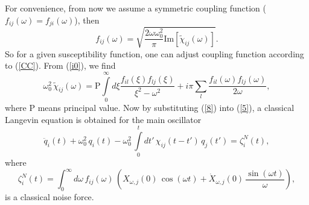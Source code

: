 \documentclass[preprint,showpacs,showkeys,groupedaddress,superscriptaddress]{revtex4}
\begin{document}
For convenience, from now we assume a symmetric coupling function ($f_{ij} (\omega)=f_{ji} (\omega)$), then
\begin{equation}\label{CC}
f_{ij} (\omega ) = \sqrt {\frac{2\omega\omega_0^2}{\pi}\mbox{Im}[\tilde{\chi} _{ij} (\omega )]}.
\end{equation}
So for a given susceptibility function, one can adjust coupling function according to (\ref{CC}). From (\ref{i0}), we find
\begin{equation}
 \omega_0^2\,\tilde{\chi} _{ij} (\omega ) = \mbox{P} \int\limits_0^\infty  {d\xi } \frac{{f_{il} (\xi )f_{lj} (\xi )}}{{\xi ^2  - \omega ^2 }} + i\pi \sum\limits_l {\frac{{f_{il} (\omega )f_{lj} (\omega )}}{{2\omega }}},
\end{equation}
where $\mbox{P}$ means principal value. Now by substituting (\ref{8}) into (\ref{5}), a classical Langevin equation is obtained for the main oscillator
\begin{equation}\label{LEq}
\ddot{q}_i (t) + \omega _0^2 \,q_i (t) -\omega_0^2\,\int\limits_0^t dt'\, \chi _{ij} (t - t')\,q_j (t') = \zeta _i^N (t),
\end{equation}
where
\begin{equation}\label{CNF}
  \zeta _i^N (t) = \int_0^\infty d\omega\, f_{ij} (\omega )\,\left(X_{\omega,j} (0)\,\cos(\omega t)+\dot{X}_{\omega,j} (0)\,\frac{\sin(\omega t)}{\omega}\right),
\end{equation}
is a classical noise force.
\end{document}
